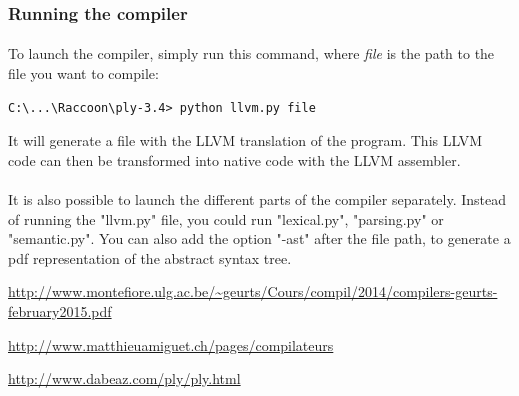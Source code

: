 \documentclass[12pt,a4paper]{article}
\begin{document}
\subsubsection{Running the compiler}
\paragraph{}
To launch the compiler, simply run this command, where \textit{file} is the path to the file you want to compile: 
\begin{verbatim}
C:\...\Raccoon\ply-3.4> python llvm.py file
\end{verbatim}
It will generate a file with the LLVM translation of the program. This LLVM code can then be transformed into native code with the LLVM assembler.

\paragraph{}
It is also possible to launch the different parts of the compiler separately. Instead of running the "llvm.py" file, you could run "lexical.py", "parsing.py" or "semantic.py". You can also add the option "-ast" after the file path, to generate a pdf representation of the abstract syntax tree.

\clearpage
\begin{thebibliography}{9}

\url{http://www.montefiore.ulg.ac.be/\~geurts/Cours/compil/2014/compilers-geurts-february2015.pdf}

\url{http://www.matthieuamiguet.ch/pages/compilateurs}

\url{http://www.dabeaz.com/ply/ply.html}


\end{thebibliography}
\end{document}
